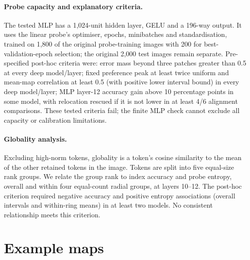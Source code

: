 \begin{table}[!htbp]
\caption{Four explanations for probe-relocation failure (post hoc). Model order: DeiT-S, DeiT-B, DINO ViT-S. Cells are the two centre-controlled metrics in the three models; criteria and probe settings are defined in this section.}
\label{tab:app-reloc}
\centering

\end{table}

\paragraph{Probe capacity and explanatory criteria.} The tested MLP has a 1,024-unit hidden layer, GELU and a 196-way output. It uses the linear probe's optimiser, epochs, minibatches and standardisation, trained on 1,800 of the original probe-training images with 200 for best-validation-epoch selection; the original 2,000 test images remain separate. Pre-specified post-hoc criteria were: error mass beyond three patches greater than 0.5 at every deep model/layer; fixed preference peak at least twice uniform and mean-map correlation at least 0.5 (with positive lower interval bound) in every deep model/layer; MLP layer-12 accuracy gain above 10 percentage points in some model, with relocation rescued if it is not lower in at least 4/6 alignment comparisons. These tested criteria fail; the finite MLP check cannot exclude all capacity or calibration limitations.

\paragraph{Globality analysis.} Excluding high-norm tokens, globality is a token's cosine similarity to the mean of the other retained tokens in the image. Tokens are split into five equal-size rank groups. We relate the group rank to index accuracy and probe entropy, overall and within four equal-count radial groups, at layers 10--12. The post-hoc criterion required negative accuracy and positive entropy associations (overall intervals and within-ring means) in at least two models. No consistent relationship meets this criterion.

\clearpage
\section{Example maps}
\label{app:gallery}

